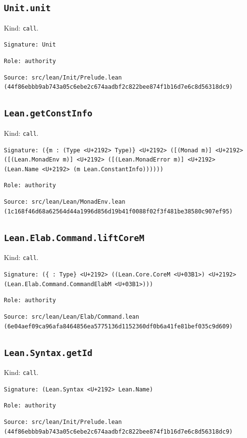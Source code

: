 \documentclass[11pt]{article}
\begin{document}
\subsection*{\texttt{Unit.unit}}
\noindent Kind: \texttt{call}.\par
\noindent \texttt{Signature: Unit}\par
\noindent \texttt{Role: authority}\par
\noindent \texttt{Source: src/lean/Init/Prelude.lean (44f86ebbb9ab743a05c6ebe2c674aadbf2c822bee874f1b16d7e6c8d56318dc9)}\par
\subsection*{\texttt{Lean.getConstInfo}}
\noindent Kind: \texttt{call}.\par
\noindent \texttt{Signature: (\{m : (Type <U+2192> Type)\} <U+2192> ([(Monad m)] <U+2192> ([(Lean.MonadEnv m)] <U+2192> ([(Lean.MonadError m)] <U+2192> (Lean.Name <U+2192> (m Lean.ConstantInfo))))))}\par
\noindent \texttt{Role: authority}\par
\noindent \texttt{Source: src/lean/Lean/MonadEnv.lean (1c168f46d68a62564d44a1996d856d19b41f0088f02f3f481be38580c907ef95)}\par
\subsection*{\texttt{Lean.Elab.Command.liftCoreM}}
\noindent Kind: \texttt{call}.\par
\noindent \texttt{Signature: (\{<U+03B1> : Type\} <U+2192> ((Lean.Core.CoreM <U+03B1>) <U+2192> (Lean.Elab.Command.CommandElabM <U+03B1>)))}\par
\noindent \texttt{Role: authority}\par
\noindent \texttt{Source: src/lean/Lean/Elab/Command.lean (6e04aef09ca96afa8464856ea5775136d1152360df0b6a41fe81bef035c9d609)}\par
\subsection*{\texttt{Lean.Syntax.getId}}
\noindent Kind: \texttt{call}.\par
\noindent \texttt{Signature: (Lean.Syntax <U+2192> Lean.Name)}\par
\noindent \texttt{Role: authority}\par
\noindent \texttt{Source: src/lean/Init/Prelude.lean (44f86ebbb9ab743a05c6ebe2c674aadbf2c822bee874f1b16d7e6c8d56318dc9)}\par
\end{document}
